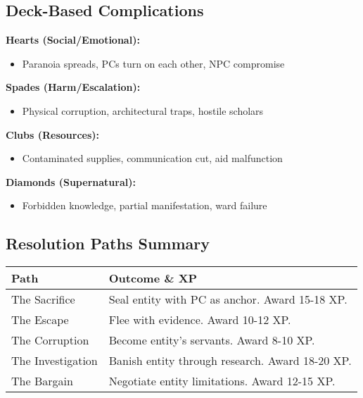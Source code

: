 \documentclass[11pt]{article}
\begin{document}
\subsection*{Deck-Based Complications}

\textbf{Hearts (Social/Emotional):}
\begin{itemize}
\item Paranoia spreads, PCs turn on each other, NPC compromise
\end{itemize}

\textbf{Spades (Harm/Escalation):}
\begin{itemize}
\item Physical corruption, architectural traps, hostile scholars
\end{itemize}

\textbf{Clubs (Resources):}
\begin{itemize}
\item Contaminated supplies, communication cut, aid malfunction
\end{itemize}

\textbf{Diamonds (Supernatural):}
\begin{itemize}
\item Forbidden knowledge, partial manifestation, ward failure
\end{itemize}

\subsection*{Resolution Paths Summary}

\begin{tabular}{|p{4cm}|p{8cm}|}
\hline
\rowcolor{tableheader}
\textbf{Path} & \textbf{Outcome \& XP} \\
\hline
The Sacrifice & Seal entity with PC as anchor. Award 15-18 XP. \\
The Escape & Flee with evidence. Award 10-12 XP. \\
The Corruption & Become entity's servants. Award 8-10 XP. \\
The Investigation & Banish entity through research. Award 18-20 XP. \\
The Bargain & Negotiate entity limitations. Award 12-15 XP. \\
\hline
\end{tabular}
\end{document}
